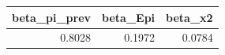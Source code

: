 \begin{tabular}{rrr}
\toprule
beta_pi_prev & beta_Epi & beta_x2 \\
\midrule
0.8028 & 0.1972 & 0.0784 \\
\bottomrule
\end{tabular}
